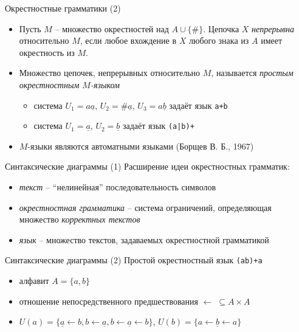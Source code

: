 \documentclass{beamer}
\begin{document}
\begin{frame}{Окрестностные грамматики (2)}
\begin{small}
\begin{itemize}
	\item Пусть $M$ -- множество окрестностей над $A \cup \{ \# \}$. Цепочка $X$ \textit{непрерывна} относительно $M$, если любое вхождение в $X$ любого знака из $A$ имеет окрестность из $M$.
	\item Множество цепочек, непрерывных относительно $M$, называется \textit{простым окрестностным $M$-языком}
		\begin{itemize}
			\item система $U_1 = a\underline{a}$, $U_2 = \#\underline{a}$, $U_3 = a\underline{b}$ задаёт язык \texttt{a+b}
			\item система $U_1 = \underline{a}$, $U_2 = \underline{b}$ задаёт язык \texttt{(a|b)+}
		\end{itemize}
	\item $M$-языки являются автоматными языками (Борщев В. Б., 1967)
\end{itemize}
\end{small}
\end{frame}


\begin{frame}{Синтаксические диаграммы (1)}
\smallskip
{\small Расширение идеи окрестностных грамматик:}
\bigskip
\begin{small}
\begin{itemize}
	\item \textit{текст} -- ``нелинейная'' последовательность символов
	\item \textit{окрестностная грамматика} -- система ограничений, определяющая множество \textit{корректных текстов}
	\item \textit{язык} -- множество текстов, задаваемых окрестностной грамматикой
\end{itemize}
\end{small}
\end{frame}

\begin{frame}{Синтаксические диаграммы (2)}
Простой окрестностный язык \texttt{(ab)+a}\\
\medskip
\begin{small}
\begin{itemize}
	\item алфавит $A = \{a, b\}$
	\item отношение непосредственного предшествования $\leftarrow \; \subseteq A \times A$
	\item $U(a) = \{\underline{a} \leftarrow b, b \leftarrow \underline{a}, b \leftarrow \underline{a} \leftarrow b\}$, $U(b) = \{ a \leftarrow \underline{b} \leftarrow a \}$
\end{itemize}
\end{small}
\end{frame}
\end{document}

